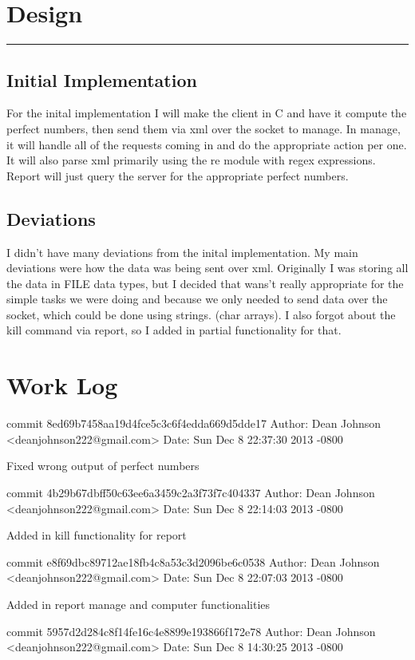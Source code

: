 \documentclass[fleqn,10pt,titlepage]{article}
\begin{document}
\section{Design}
\hrule
\subsection{Initial Implementation}
For the inital implementation I will make the client in C and have it compute the
perfect numbers, then send them via xml over the socket to manage. In manage, it will
handle all of the requests coming in and do the appropriate action per one. It will also
parse xml primarily using the re module with regex expressions. Report will just query the
server for the appropriate perfect numbers.
\subsection{Deviations}
I didn't have many deviations from the inital implementation. My main deviations were
how the data was being sent over xml. Originally I was storing all the data in FILE data types,
but I decided that wans't really appropriate for the simple tasks we were doing and because we
only needed to send data over the socket, which could be done using strings. (char arrays).
I also forgot about the kill command via report, so I added in partial functionality for that.
\clearpage

\section{Work Log}
commit 8ed69b7458aa19d4fce5c3c6f4edda669d5dde17
Author: Dean Johnson <deanjohnson222@gmail.com>
Date:   Sun Dec 8 22:37:30 2013 -0800

    Fixed wrong output of perfect numbers

commit 4b29b67dbff50c63ee6a3459c2a3f73f7c404337
Author: Dean Johnson <deanjohnson222@gmail.com>
Date:   Sun Dec 8 22:14:03 2013 -0800

    Added in kill functionality for report

commit e8f69dbc89712ae18fb4c8a53c3d2096be6c0538
Author: Dean Johnson <deanjohnson222@gmail.com>
Date:   Sun Dec 8 22:07:03 2013 -0800

    Added in report manage and computer functionalities

commit 5957d2d284c8f14fe16c4e8899e193866f172e78
Author: Dean Johnson <deanjohnson222@gmail.com>
Date:   Sun Dec 8 14:30:25 2013 -0800
\end{document}
